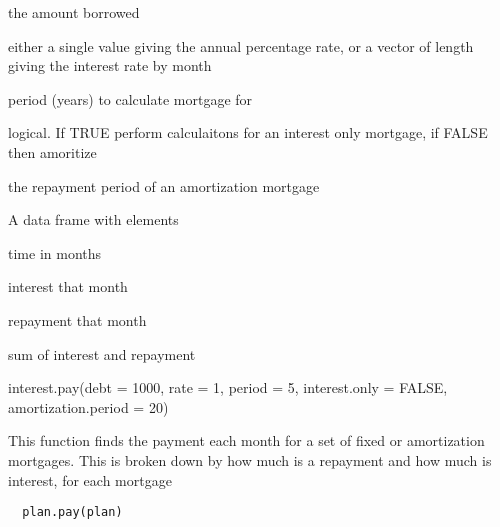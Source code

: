 \documentclass[a4paper]{book}
\begin{document}
\begin{Arguments}
\begin{ldescription}
\item[\code{debt}] the amount borrowed

\item[\code{rate}] either a single value giving the annual
percentage rate, or a vector of length 
giving the interest rate by month

\item[\code{period}] period (years) to calculate mortgage for

\item[\code{interest.only}] logical. If TRUE perform
calculaitons for an interest only mortgage, if FALSE then
amoritize

\item[\code{amortization.period}] the repayment period of an
amortization mortgage
\end{ldescription}
\end{Arguments}
%
\begin{Value}
A data frame with elements \begin{ldescription}
\item[\code{month}] time in months
\item[\code{interest}] interest that month
\item[\code{repayment}] repayment that month\item[\code{payment}] sum
of interest and repayment
\end{ldescription}
\end{Value}
%
\begin{Examples}
\begin{ExampleCode}
interest.pay(debt = 1000, rate = 1, period = 5, interest.only = FALSE, amortization.period = 20)
\end{ExampleCode}
\end{Examples}
%
\begin{Description}\relax
This function finds the payment each month for a set of
fixed or amortization mortgages. This is broken down by
how much is a repayment and how much is interest, for
each mortgage
\end{Description}
%
\begin{Usage}
\begin{verbatim}
  plan.pay(plan)
\end{verbatim}
\end{Usage}
\end{document}
